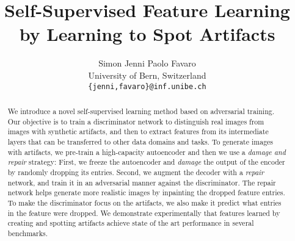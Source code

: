 \documentclass[10pt,twocolumn,letterpaper]{article}
\begin{document}
\title{Self-Supervised Feature Learning by Learning to Spot Artifacts}

\author{Simon Jenni \qquad Paolo Favaro\\
University of Bern, Switzerland\\
{\tt\small \{jenni,favaro\}@inf.unibe.ch}}



\maketitle


\begin{abstract}
We introduce a novel self-supervised learning method based on adversarial training. Our objective is to train a discriminator network to distinguish real images from images with synthetic artifacts, and then to extract features from its intermediate layers that can be transferred to other data domains and tasks. 
To generate images with artifacts, we pre-train a high-capacity autoencoder and then we use a \emph{damage and repair} strategy: First, we freeze the autoencoder and \emph{damage} the output of the encoder by randomly dropping its entries. Second, we augment the decoder with a \emph{repair} network, and train it in an adversarial manner against the discriminator. The repair network helps generate more realistic images by inpainting the dropped feature entries. To make the discriminator focus on the artifacts, we also make it predict what entries in the feature were dropped. %
We demonstrate experimentally that features learned by creating and spotting artifacts achieve state of the art performance in several benchmarks.
\end{abstract}
\end{document}
